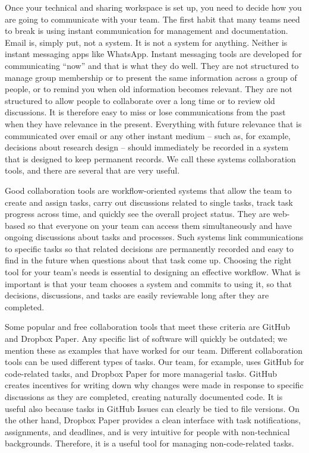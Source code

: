 Once your technical and sharing workspace is set up,
you need to decide how you are going to communicate with your team.
The first habit that many teams need to break
is using instant communication for management and documentation.
Email is, simply put, not a system. It is not a system for anything.
Neither is instant messaging apps like WhatsApp.
Instant messaging tools are developed for communicating ``now'' and that is what they do well.
They are not structured to manage group membership or to present the same information
across a group of people, or to remind you when old information becomes relevant.
They are not structured to allow people to collaborate over a long time or to review old discussions.
It is therefore easy to miss or lose communications from the past when they have relevance in the present.
Everything with future relevance that is communicated over email or any other instant medium
-- such as, for example, decisions about research design --
should immediately be recorded in a system that is designed to keep permanent records.
We call these systems collaboration tools, and there are several that are very useful.

Good collaboration tools are workflow-oriented systems
that allow the team to create and assign tasks,
carry out discussions related to single tasks,
track task progress across time, and quickly see the overall project status.
They are web-based so that everyone on your team can access them simultaneously
and have ongoing discussions about tasks and processes.
Such systems link communications to specific tasks so that
related decisions are permanently recorded
and easy to find in the future when questions about that task come up.
Choosing the right tool for your team's needs is essential to designing an effective workflow.
What is important is that your team chooses a system and commits to using it,
so that decisions, discussions, and tasks are easily reviewable long after they are completed.

Some popular and free collaboration tools that meet these criteria are
GitHub and Dropbox Paper.
Any specific list of software will quickly be outdated;
we mention these as examples that have worked for our team.
Different collaboration tools can be used different types of tasks.
Our team, for example, uses GitHub for code-related tasks,
and Dropbox Paper for more managerial tasks.
GitHub creates incentives for writing down why changes were made
in response to specific discussions
as they are completed, creating naturally documented code.
It is useful also because tasks in GitHub Issues can clearly be tied to file versions.
On the other hand, Dropbox Paper provides a clean interface with task notifications,
assignments, and deadlines,
and is very intuitive for people with non-technical backgrounds.
Therefore, it is a useful tool for managing non-code-related tasks.


